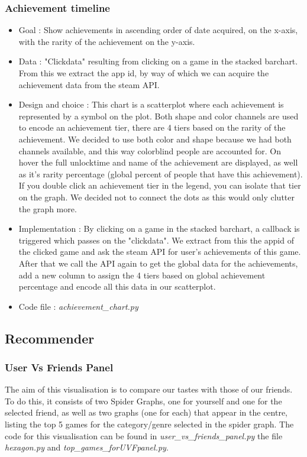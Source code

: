 \documentclass{article}
\begin{document}
    \subsubsection{Achievement timeline}
    \begin{itemize}
        \item Goal : Show achievements in ascending order of date acquired, on the x-axis, with the rarity of the achievement on the y-axis.
        \item Data : "Clickdata" resulting from clicking on a game in the stacked barchart. From this we extract the app id, by way of which we can acquire the achievement data from the steam API.
        \item Design and choice : This chart is a scatterplot where each achievement is represented by a symbol on the plot. Both shape and color channels are used to encode an achievement tier, there are 4 tiers based on the rarity of the achievement. We decided to use both color and shape because we had both channels available, and this way colorblind people are accounted for. On hover the full unlocktime and name of the achievement are displayed, as well as it's rarity percentage (global percent of people that have this achievement). If you double click an achievement tier in the legend, you can isolate that tier on the graph. We decided not to connect the dots as this would only clutter the graph more.
        \item Implementation : By clicking on a game in the stacked barchart, a callback is triggered which passes on the "clickdata". We extract from this the appid of the clicked game and ask the steam API for user's achievements of this game. After that we call the API again to get the global data for the achievements, add a new column to assign the 4 tiers based on global achievement percentage and encode all this data in our scatterplot.
        \item Code file : \textit{achievement\_chart.py}
    \end{itemize}
    
	\subsection{Recommender}
    
	\subsubsection{User Vs Friends Panel}
	The aim of this visualisation is to compare our tastes with those of our friends. To do this, it consists of two Spider Graphs, one for yourself and one for the selected friend, as well as two graphs (one for each) that appear in the centre, listing the top 5 games for the category/genre selected in the spider graph. The code for this visualisation can be found in \textit{user\_vs\_friends\_panel.py} the file \textit{hexagon.py} and \textit{top\_games\_forUVFpanel.py}.
\end{document}

